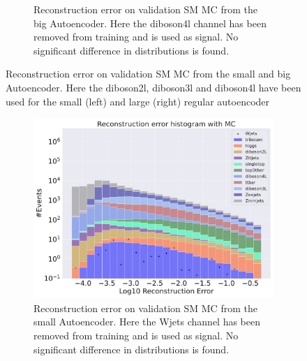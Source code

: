 \begin{figure}[H]
\begin{subfigure}{.45\textwidth}
        \caption{Reconstruction error on validation SM MC from the big Autoencoder. Here the diboson4l channel has been removed from training and 
        is used as signal. No significant difference in distributions is found. }
        \label{fig:ae_big_diboson4l}
    \end{subfigure}
    \hfill  
    \caption[AE | Channel removal, diboson2l, diboson3l, diboson4l]{Reconstruction error on validation SM MC from the small and big Autoencoder. Here the diboson2l, diboson3l and diboson4l have been used for the
    small (left) and large (right) regular autoencoder}
    \label{fig:ae_big_channel3}
\end{figure}


\begin{figure}[H]
    \centering
    \begin{subfigure}{.45\textwidth}
        \includegraphics[width=\textwidth]{Figures/AE_testing/small/b_data_recon_big_rm3_feats_sig_Wjets.pdf}
        \caption{Reconstruction error on validation SM MC from the small Autoencoder. Here the Wjets channel has been removed from training and 
        is used as signal. No significant difference in distributions is found.}
        \label{fig:ae_small_Wjets}
    \end{subfigure}
    \hfill 
    \begin{subfigure}{.45\textwidth}

\end{subfigure}
\end{figure}
